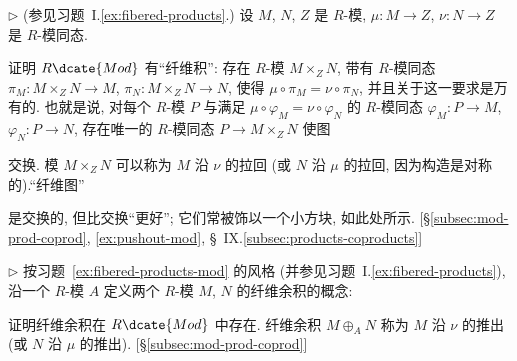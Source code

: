 \begin{prob}
\label{ex:fibered-products-mod}
$\triangleright$ (参见习题~I.\ref{ex:fibered-products}.) 设 $M$, $N$, $Z$ 是 $R$-模, $\mu : M \to Z$, $\nu : N \to Z$ 是 $R$-模同态.

证明 $R\dcate{Mod}$ 有``纤维积'': 存在 $R$-模 $M \times_Z N$, 带有 $R$-模同态 $\pi_M : M \times_Z N \to M$, $\pi_N : M \times_Z N \to N$, 使得 $\mu \circ \pi_M = \nu \circ \pi_N$, 并且关于这一要求是万有的. 也就是说, 对每个 $R$-模 $P$ 与满足 $\mu \circ \varphi_M = \nu \circ \varphi_N$ 的 $R$-模同态 $\varphi_M : P \to M$, $\varphi_N : P \to N$, 存在唯一的 $R$-模同态 $P \to M \times_Z N$ 使图
\begin{center}
\end{center}
交换. 模 $M \times_Z N$ 可以称为 $M$ 沿 $\nu$ 的拉回 (或 $N$ 沿 $\mu$ 的拉回, 因为构造是对称的).``纤维图''
\begin{center}
\end{center}
是交换的, 但比交换``更好''; 它们常被饰以一个小方块, 如此处所示. [\S\ref{subsec:mod-prod-coprod}, \ref{ex:pushout-mod}, \S~IX.\ref{subsec:products-coproducts}]
\end{prob}

\begin{prob}
\label{ex:pushout-mod}
$\triangleright$ 按习题~\ref{ex:fibered-products-mod} 的风格 (并参见习题~I.\ref{ex:fibered-products}), 沿一个 $R$-模 $A$ 定义两个 $R$-模 $M$, $N$ 的纤维余积的概念:
\begin{center}
\end{center}
证明纤维余积在 $R\dcate{Mod}$ 中存在. 纤维余积 $M \oplus_A N$ 称为 $M$ 沿 $\nu$ 的推出 (或 $N$ 沿 $\mu$ 的推出). [\S\ref{subsec:mod-prod-coprod}]
\end{prob}


